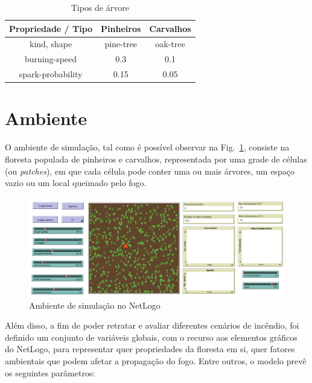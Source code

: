 \begin{table}[tbhp]
    \centering
    \begin{tabular}{ccc}
        \hline
        \textbf{Propriedade / Tipo} & \textbf{Pinheiros} & \textbf{Carvalhos} \\ \hline
        kind, shape                 & pine-tree          & oak-tree           \\
        burning-speed               & 0.3                & 0.1                \\
        spark-probability           & 0.15               & 0.05               \\ \hline
    \end{tabular}
    \caption{Tipos de árvore}
    \label{tab:tree_types}
\end{table}


\section{Ambiente}\label{sec:environment}

O ambiente de simulação, tal como é possível observar na Fig.~\ref{fig:environment}, consiste na floresta populada de pinheiros e carvalhos, representada por uma grade de células (ou \textit{patches}), em que cada célula pode conter uma ou mais árvores, um espaço vazio ou um local queimado pelo fogo.

\begin{figure}[htbp]
    \centering
    \includegraphics[width=\linewidth]{images/environment}
    \caption{Ambiente de simulação no NetLogo}
    \label{fig:environment}
\end{figure}

Além disso, a fim de poder retratar e avaliar diferentes cenários de incêndio, foi definido um conjunto de variáveis globais, com o recurso aos elementos gráficos do NetLogo, para representar quer propriedades da floresta em si, quer fatores ambientais que podem afetar a propagação do fogo.
Entre outros, o modelo prevê os seguintes parâmetros:

